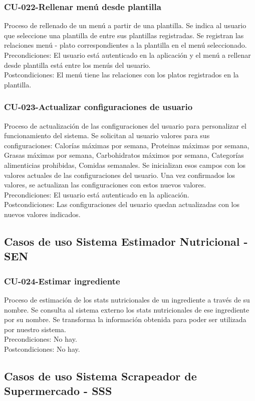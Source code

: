 \documentclass[12pt, a4paper, twoside]{book}
\begin{document}
	\subsubsection{CU-022-Rellenar menú desde plantilla}
	Proceso de rellenado de un menú a partir de una plantilla.
	Se indica al usuario que seleccione una plantilla de entre sus plantillas registradas.
	Se registran las relaciones menú - plato correspondientes a la plantilla en el menú seleccionado.\\
	Precondiciones: El usuario está autenticado en la aplicación y el menú a rellenar desde plantilla está entre los menús del usuario.\\
	Postcondiciones: El menú tiene las relaciones con los platos registrados en la plantilla.
	\subsubsection{CU-023-Actualizar configuraciones de usuario}
	Proceso de actualización de las configuraciones del usuario para personalizar el funcionamiento del sistema.
	Se solicitan al usuario valores para sus configuraciones: Calorías máximas por semana, Proteinas máximas por semana, Grasas máximas por semana, Carbohidratos máximos por semana, Categorías alimenticias prohibidas, Comidas semanales.
	Se inicializan esos campos con los valores actuales de las configuraciones del usuario.
	Una vez confirmados los valores, se actualizan las configuraciones con estos nuevos valores.\\
	Precondiciones: El usuario está autenticado en la aplicación.\\
	Postcondiciones: Las configuraciones del usuario quedan actualizadas con los nuevos valores indicados.
	\subsection{Casos de uso Sistema Estimador Nutricional - SEN}
	\subsubsection{CU-024-Estimar ingrediente}
	Proceso de estimación de los stats nutricionales de un ingrediente a través de su nombre.
	Se consulta al sistema externo los stats nutricionales de ese ingrediente por su nombre.
	Se transforma la información obtenida para poder ser utilizada por nuestro sistema.\\
	Precondiciones: No hay.\\
	Postcondiciones: No hay.
	\subsection{Casos de uso Sistema Scrapeador de Supermercado - SSS}
\end{document}

